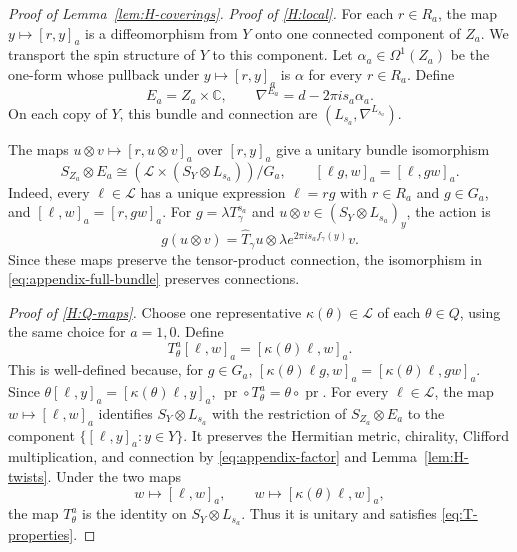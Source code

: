 \documentclass[12pt,reqno]{amsart}
\numberwithin{equation}{section}
\theoremstyle{definition}
\begin{document}
\begin{proof}[Proof of Lemma~\ref{lem:H-coverings}]
\emph{Proof of \ref{H:local}.}
For each $r\in R_a$, the map $y\mapsto[r,y]_a$ is a diffeomorphism
from $Y$ onto one connected component of $Z_a$. We transport the spin
structure of $Y$ to this component. Let $\alpha_a\in\Omega^1(Z_a)$ be the one-form whose pullback under $y\mapsto[r,y]_a$ is $\alpha$ for every $r\in R_a$.
Define
\[
 E_a=Z_a\times\mathbb C,
 \qquad
 \nabla^{E_a}=d-2\pi i s_a\alpha_a.
\]
On each copy of $Y$, this bundle and connection are
$(L_{s_a},\nabla^{L_{s_a}})$.

The maps $u\otimes v\mapsto[r,u\otimes v]_a$ over $[r,y]_a$ give
a unitary bundle isomorphism
\begin{equation}\label{eq:appendix-full-bundle}
 S_{Z_a}\otimes E_a
 \cong(\mathcal L\times(S_Y\otimes L_{s_a}))/G_a,
 \qquad [\ell g,w]_a=[\ell,gw]_a.
\end{equation}
Indeed, every $\ell\in\mathcal L$ has a unique expression $\ell=rg$
with $r\in R_a$ and $g\in G_a$, and $[\ell,w]_a=[r,gw]_a$.
For $g=\lambda T^{s_a}_\gamma$ and
$u\otimes v\in(S_Y\otimes L_{s_a})_y$, the action is
\begin{equation}\label{eq:appendix-factor}
 g(u\otimes v)
 =\widehat T_\gamma u\otimes
   \lambda e^{2\pi i s_a f_\gamma(y)}v.
\end{equation}
Since these maps preserve the tensor-product connection,
the isomorphism in \eqref{eq:appendix-full-bundle} preserves
connections.


\emph{Proof of \ref{H:Q-maps}.}
Choose one representative $\kappa(\theta)\in\mathcal L$ of each
$\theta\in Q$, using the same choice for $a=1,0$.  Define
\[
 T^a_\theta[\ell,w]_a=[\kappa(\theta)\ell,w]_a.
\]
This is well-defined because, for $g\in G_a$,
$[\kappa(\theta)\ell g,w]_a=[\kappa(\theta)\ell,gw]_a$.
Since $\theta[\ell,y]_a=[\kappa(\theta)\ell,y]_a$,
$\operatorname{pr}\circ T^a_\theta=\theta\circ\operatorname{pr}$.
For every $\ell\in\mathcal L$, the map
$w\mapsto[\ell,w]_a$ identifies $S_Y\otimes L_{s_a}$ with
the restriction of $S_{Z_a}\otimes E_a$ to the component
$\{[\ell,y]_a:y\in Y\}$.  It preserves the Hermitian metric,
chirality, Clifford multiplication, and connection by
\eqref{eq:appendix-factor} and Lemma~\ref{lem:H-twists}.
Under the two maps
\[
 w\longmapsto[\ell,w]_a,
 \qquad
 w\longmapsto[\kappa(\theta)\ell,w]_a,
\]
the map $T_\theta^a$ is the identity on $S_Y\otimes L_{s_a}$.
Thus it is unitary and satisfies \eqref{eq:T-properties}.



\end{proof}
\end{document}
